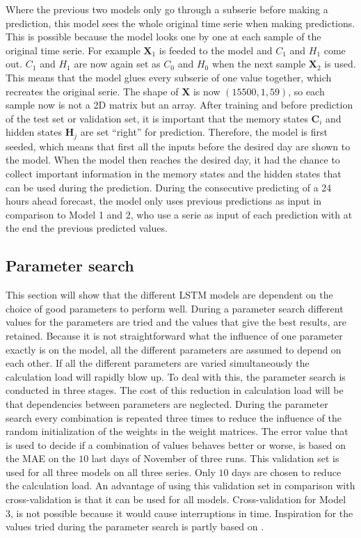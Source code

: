 Where the previous two models only go through a subserie before making a prediction, this model sees the whole original time serie when making predictions. This is possible because the model looks one by one at each sample of the original time serie. For example $ \bm{X}_{1} $ is feeded to the model and $ C_{1} $ and $ H_{1} $ come out.  $ C_{1} $ and $ H_{1} $ are now again set as $ C_{0} $ and $ H_{0} $ when the next sample $ \bm{X}_{2}  $ is used. This means that the model glues every subserie of one value together, which recreates the original serie. The shape of $ \bm{X} $ is now $ (15500, 1, 59) $, so each sample now is not a 2D matrix but an array. After training and before prediction of the test set or validation set, it is important that the memory states $ \bm{C}_{i} $  and hidden states $ \bm{H}_{j} $ are set ``right'' for prediction. Therefore, the model is first seeded, which means that first all the inputs before the desired day are shown to the model. When the model then reaches the desired day, it had the chance to collect important information in the memory states and the hidden states that can be used during the prediction. During the consecutive predicting of a 24 hours ahead forecast, the model only uses previous predictions as input in comparison to Model 1 and 2, who use a serie as input of each prediction with at the end the previous predicted values.

\subsection{Parameter search}\label{s:Parameter search}
This section will show that the different LSTM models are dependent on the choice of good parameters to perform well. During a parameter search different values for the parameters are tried and the values that give the best results, are retained. Because it is not straightforward what the influence of one parameter exactly is on the model, all the different parameters are assumed to depend on each other. If all the different parameters are varied simultaneously the calculation load will rapidly blow up. To deal with this, the parameter search is conducted in three stages. The cost of this reduction in calculation load will be that dependencies between parameters are neglected. During the parameter search every combination is repeated three times to reduce the influence of the random initialization of the weights in the weight matrices. The error value that is used to decide if a combination of values behaves better or worse, is based on the MAE on the $ 10 $ last days of November of three runs. This validation set is used for all three models on all three series. Only $ 10 $ days are chosen to reduce the calculation load. An advantage of using this validation set in comparison with cross-validation is that it can be used for all models. Cross-validation for Model 3, is not possible because it would cause interruptions in time. Inspiration for the values tried during the parameter search is partly based on \cite{Shi2018}.

